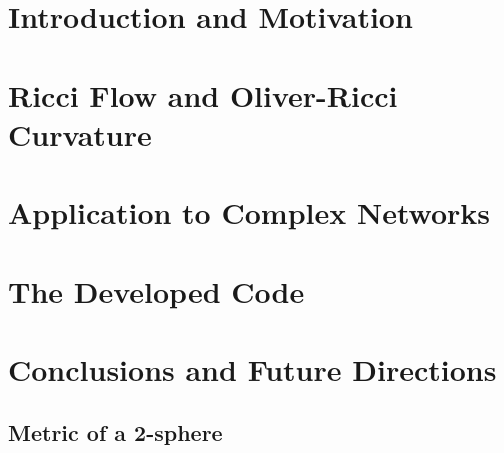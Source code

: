 \documentclass[a4paper,12pt,twoside,customfont,custombib,PageStyleI,draftclassic]{Settings/PhDThesisPSnPDF}
\begin{document}
\chapter{Introduction and Motivation}\label{chap:chapter2}





\chapter{Ricci Flow and Oliver-Ricci Curvature}\label{chap:chapter3}




\chapter{Application to Complex Networks}\label{chap:chapter4}



\chapter{The Developed Code}\label{chap:chapter5}





\chapter{Conclusions and Future Directions}\label{chap:chapter6}

\begin{appendices} %
\chapter{Metric of a 2-sphere}

\end{appendices}

\backmatter

\begin{spacing}{0.9}

\cleardoublepage
\nocite{*}
\printbibliography[heading=bibintoc, title={References}]

\end{spacing}

\end{document}
